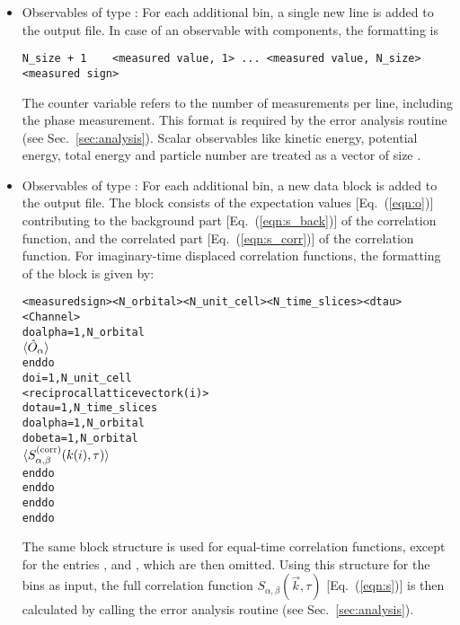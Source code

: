 \begin{itemize}
\item Observables of type :
For each additional bin, a single new line is added to the output file.
In case of an observable with  components, the formatting is 
\begin{verbatim}
N_size + 1    <measured value, 1> ... <measured value, N_size>    <measured sign>
\end{verbatim}
The counter variable  refers to the number of measurements per line, including the phase measurement. 
This format is required by the error analysis routine (see Sec.~\ref{sec:analysis}). 
Scalar observables like kinetic energy, potential energy, total energy and particle number are treated as a vector 
of size .

\item Observables of type :
For each additional bin, a new data block is added to the output file. 
The block consists of the expectation values [Eq.~(\ref{eqn:o})] contributing to the background part [Eq.~(\ref{eqn:s_back})] of the correlation function,
and the correlated part [Eq.~(\ref{eqn:s_corr})] of the correlation function.
For imaginary-time displaced correlation functions, the formatting of the block is given by:
\begin{alltt}
<measured sign>  <N_orbital>  <N_unit_cell>  <N_time_slices>  <dtau>  <Channel>
do alpha = 1, N_orbital
    \(\langle\hat{O}\sb{\alpha}\rangle \)
enddo
do i = 1, N_unit_cell
   <reciprocal lattice vector k(i)>
   do tau = 1, N_time_slices
      do alpha = 1, N_orbital
         do beta = 1, N_orbital
            \(\langle{S}\sb{\alpha,\beta}\sp{(\mathrm{corr})}(k(i),\tau)\rangle\)
         enddo
      enddo
   enddo
enddo
\end{alltt}
The same block structure is used for equal-time correlation functions, except for the entries  ,  and , which are then omitted.
Using this structure for the bins as input, the full correlation function $S_{\alpha,\beta}(\vec{k},\tau)$ [Eq.~(\ref{eqn:s})] is then calculated by calling the error analysis routine (see Sec.~\ref{sec:analysis}).
\end{itemize}


%

